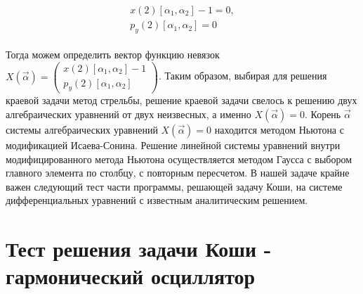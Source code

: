 \documentclass[a4paper,12pt]{article}
\begin{document}
\begin{align}
\begin{align*}
x(2)\left[\alpha_1,\alpha_2\right]-1=0,\\
p_y(2)\left[\alpha_1,\alpha_2\right]=0
\end{align*}
\end{align}

Тогда можем определить вектор функцию невязок 
$
X(\overrightarrow{\alpha})=
\begin{pmatrix}
    x(2)\left[\alpha_1,\alpha_2\right]-1\\
    p_y(2)\left[\alpha_1,\alpha_2\right]
\end{pmatrix}$.
Таким образом, выбирая для решения краевой задачи метод стрельбы, решение краевой задачи свелось к решению двух алгебраических уравнений от двух неизвесных, а именно 
$
X(\overrightarrow{\alpha})=0
$.
Корень $\overrightarrow{\alpha}$ системы алгебраических уравнений $X(\overrightarrow{\alpha})=0$ находится методом Ньютона с модификацией Исаева-Сонина. Решение линейной системы уравнений внутри модифицированного метода Ньютона осуществляется методом Гаусса с выбором главного элемента по столбцу, с повторным пересчетом.
В нашей задаче крайне важен следующий тест части программы, решающей задачу Коши, на системе дифференциальных уравнений с известным аналитическим решением.





\section{Тест  решения задачи Коши - гармонический осциллятор}
\end{document}
